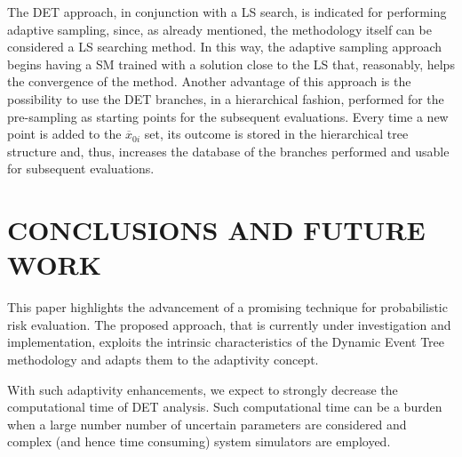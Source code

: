 \documentclass{anstrans}
\begin{document}
The DET approach, in conjunction with a LS search, is indicated for performing adaptive sampling, since, as already mentioned, the methodology itself can be considered a LS searching method. In this way, the adaptive sampling approach begins having a SM trained with a solution close to the LS that, reasonably, helps the convergence of the method. 
Another advantage of this approach is the possibility to use the DET branches, in a hierarchical fashion, performed for the pre-sampling as starting points for the subsequent evaluations. Every time a new point is added to the  $\overline{x}_{0i}$ set, its outcome is stored in the hierarchical tree structure and, thus, increases the database of the branches performed and usable for subsequent evaluations.
\section{CONCLUSIONS AND FUTURE WORK}
This paper highlights the advancement of a promising technique for probabilistic risk evaluation. The proposed approach, that is currently under investigation and implementation, exploits the intrinsic characteristics of the Dynamic Event Tree methodology and adapts them to the adaptivity concept. 

With such adaptivity enhancements, we expect to strongly decrease the computational time of DET analysis. Such computational time can be a burden when a large number number of uncertain parameters are considered and complex (and hence time consuming) system simulators are employed.




\end{document}
